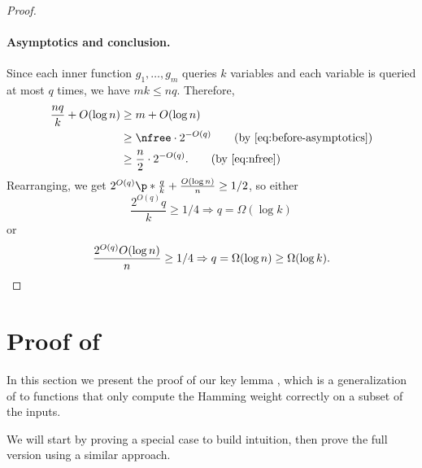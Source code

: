 \begin{proof}
\paragraph*{Asymptotics and conclusion.}
Since each inner function $g_1, \ldots, g_m$ queries $k$ variables and each variable is queried at most $q$ times, we have
$mk \leq nq$. %
Therefore,
\begin{align*}
    \frac{nq}{k} + O(\log n)
    &\geq m + O(\log n)\\%
    &\geq \nfree \cdot 2^{-O(q)}\tag{by \eqref{eq:before-asymptotics}}\\
    &\geq \frac{n}{2} \cdot 2^{-O(q)}.\tag{by \eqref{eq:nfree}}
\end{align*}
Rearranging, we get $2^{O(q)} \p*{\frac{q}{k} + \frac{O(\log n)}{n}} \geq 1/2$, so either
\[\frac{2^{O(q)}q}{k} \geq 1/4 \Rightarrow q = \Omega(\log k)\]
or
\[\frac{2^{O(q)}O(\log n)}{n} \geq 1/4 \Rightarrow q = \Omega(\log n) \geq \Omega(\log k).\qedhere\]
\end{proof}

\section{Proof of~}
\label{sec:proof-main}
In this section we present the proof of our key lemma , which is a generalization of  to functions that only compute the Hamming weight correctly on a subset of the inputs.

\keylemma*

We will start by proving a special case to build intuition, then prove the full version using a similar approach.

